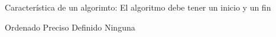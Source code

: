 
\question Característica de un algorimto: El algoritmo debe tener un
          inicio y un fin

  \begin{oneparchoices}
    \choice Ordenado
    \choice Preciso
    \choice Definido
    \CorrectChoice Ninguna
  \end{oneparchoices}
